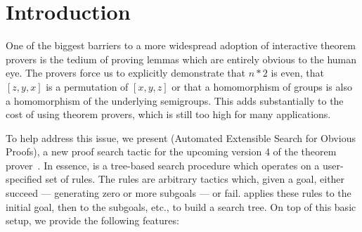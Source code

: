 \section{Introduction}

One of the biggest barriers to a more widespread adoption of interactive theorem provers is the tedium of proving lemmas which are entirely obvious to the human eye.
The provers force us to explicitly demonstrate that $n * 2$ is even, that $[z, y, x]$ is a permutation of $[x, y, z]$ or that a homomorphism of groups is also a homomorphism of the underlying semigroups.
This adds substantially to the cost of using theorem provers, which is still too high for many applications.

To help address this issue, we present \Aesop{} (Automated Extensible Search for
Obvious Proofs), a new proof search tactic for the upcoming version 4 of the \Lean{} theorem prover~\cite{Lean4}.
In essence, \Aesop{} is a tree-based search procedure which operates on a user-specified set of rules.
The rules are arbitrary \Lean{} tactics which, given a goal, either succeed --- generating zero or more subgoals --- or fail.
\Aesop{} applies these rules to the initial goal, then to the subgoals, etc., to build a search tree.
On top of this basic setup, we provide the following features:

